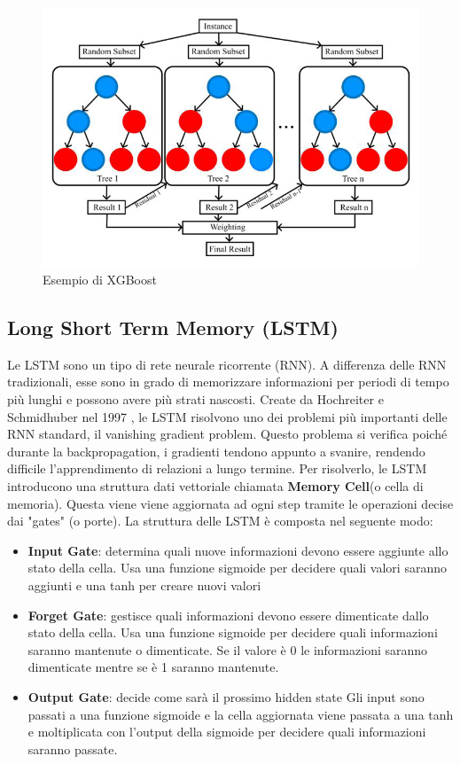 \documentclass[12pt,a4paper,openright,twoside]{book}
\begin{document}
\begin{figure}[H]
    \centering
    \includegraphics[width=.8\linewidth]{figures/XGBoost_structure.png}
    \caption{Esempio di XGBoost \cite{Xgboostimage}}
    \label{fig:XGBoost}
\end{figure}


\subsection{Long Short Term Memory (LSTM)}

Le LSTM sono un tipo di rete neurale ricorrente (RNN). 
A differenza delle RNN tradizionali, esse sono in grado di
memorizzare informazioni per periodi di tempo più lunghi e possono
avere più strati nascosti. Create da Hochreiter e Schmidhuber nel 1997 \cite{LSTM1997},
le LSTM risolvono uno dei problemi più importanti
delle RNN standard, il vanishing gradient problem. Questo
problema si verifica poiché durante la backpropagation, i gradienti
tendono appunto a svanire, rendendo difficile l'apprendimento
di relazioni a lungo termine. 
Per risolverlo, le LSTM introducono una struttura dati vettoriale
chiamata \textbf{Memory Cell}(o cella di memoria). Questa viene
viene aggiornata ad ogni step tramite le operazioni decise dai "gates" (o porte).
La struttura delle LSTM è composta nel seguente modo:
\begin{itemize}
    \item \textbf{Input Gate}: determina quali nuove informazioni
    devono essere aggiunte allo stato della cella. Usa una funzione
    sigmoide per decidere quali valori saranno aggiunti e una tanh
    per creare nuovi valori
    \item \textbf{Forget Gate}: gestisce quali informazioni
    devono essere dimenticate dallo stato della cella. Usa una funzione
    sigmoide per decidere quali informazioni saranno mantenute o dimenticate.
    Se il valore è 0 le informazioni saranno dimenticate mentre se è 1 saranno mantenute.
    \item \textbf{Output Gate}: decide come sarà il prossimo hidden state
    Gli input sono passati a una funzione sigmoide e la cella
    aggiornata viene passata a una tanh e moltiplicata con l'output della sigmoide
    per decidere quali informazioni saranno passate.
\end{itemize}
\end{document}
